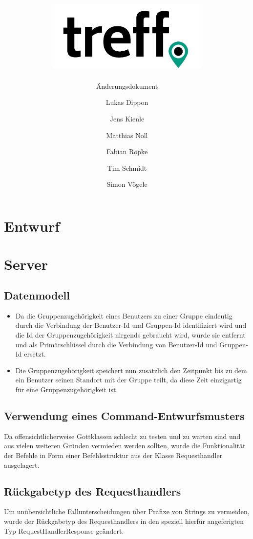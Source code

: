 \documentclass[parskip=full,11pt]{scrartcl}
\title{\includegraphics[width = 80mm]{images/logo_crop.png}}
\subtitle{\huge Änderungsdokument}
\author{Lukas Dippon
        \and Jens Kienle
        \and Matthias Noll
        \and Fabian Röpke
        \and Tim Schmidt
        \and Simon Vögele}
\begin{document}
\maketitle
\thispagestyle{empty} %

\pagebreak
\tableofcontents

\pagebreak
\section{Entwurf}



\pagebreak
\section{Server}

\subsection{Datenmodell}
\begin{itemize}
\item Da die Gruppenzugehörigkeit eines Benutzers zu einer Gruppe eindeutig
durch die Verbindung der Benutzer-Id und Gruppen-Id identifiziert wird und die
Id der Gruppenzugehörigkeit nirgends gebraucht wird, wurde sie entfernt und als
Primärschlüssel durch die Verbindung von Benutzer-Id und Gruppen-Id ersetzt.
\item Die Gruppenzugehörigkeit speichert nun zusätzlich den Zeitpunkt bis zu
dem ein Benutzer seinen Standort mit der Gruppe teilt, da diese Zeit
einzigartig für eine Gruppenzugehörigkeit ist.
\end{itemize}

\subsection{Verwendung eines Command-Entwurfsmusters}
Da offensichtlicherweise Gottklassen schlecht zu testen und zu warten sind und
aus vielen weiteren Gründen vermieden werden sollten, wurde die Funktionalität
der Befehle in Form einer Befehlsstruktur aus der Klasse Requesthandler
ausgelagert.

\subsection{Rückgabetyp des Requesthandlers}
Um unübersichtliche Fallunterscheidungen über Präfixe von Strings
zu vermeiden, wurde der Rückgabetyp des Requesthandlers in den speziell
hierfür angeferigten Typ RequestHandlerResponse geändert.
\end{document}
